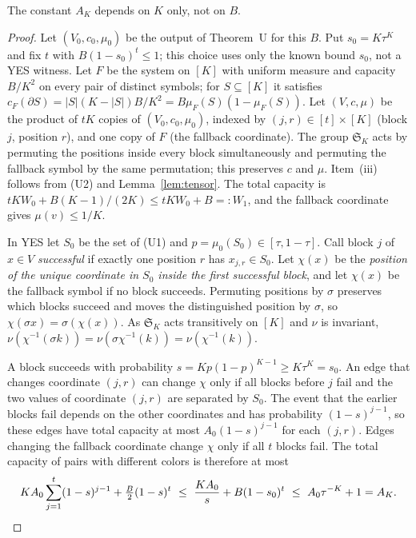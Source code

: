 \documentclass[11pt,letterpaper]{article}
\theoremstyle{definition}
\theoremstyle{remark}
\begin{document}
The constant \(A_K\) depends on \(K\) only, not on \(B\).

\begin{proof}
Let \((V_0,c_0,\mu_0)\) be the output of Theorem~U for this \(B\). Put
\(s_0=K\tau^K\) and fix \(t\) with \(B(1-s_0)^t\le1\); this choice uses only
the known bound \(s_0\), not a YES witness. Let \(F\) be the system on \([K]\)
with uniform measure and capacity \(B/K^2\) on every pair of distinct
symbols; for \(S\subseteq[K]\) it satisfies
\(c_F(\partial S)=|S|(K-|S|)B/K^2=B\mu_F(S)(1-\mu_F(S))\). Let \((V,c,\mu)\)
be the product of \(tK\) copies of \((V_0,c_0,\mu_0)\), indexed by
\((j,r)\in[t]\times[K]\) (block \(j\), position \(r\)), and one copy of
\(F\) (the fallback coordinate). The group \(\mathfrak S_K\) acts by
permuting the positions inside every block simultaneously and permuting the
fallback symbol by the same permutation; this preserves \(c\) and \(\mu\).
Item~(iii) follows from (U2) and Lemma~\ref{lem:tensor}. The total capacity
is \(tKW_0+B(K-1)/(2K)\le tKW_0+B=:W_1\), and the fallback coordinate gives
\(\mu(v)\le1/K\).

In YES let \(S_0\) be the set of (U1) and \(p=\mu_0(S_0)\in[\tau,1-\tau]\).
Call block \(j\) of \(x\in V\) \emph{successful} if exactly one position
\(r\) has \(x_{j,r}\in S_0\). Let \(\chi(x)\) be the \emph{position of the
unique coordinate in \(S_0\) inside the first successful block}, and let
\(\chi(x)\) be the fallback symbol if no block succeeds. Permuting positions
by \(\sigma\) preserves which blocks succeed and moves the distinguished
position by \(\sigma\), so \(\chi(\sigma x)=\sigma(\chi(x))\). As
\(\mathfrak S_K\) acts transitively on \([K]\) and \(\nu\) is invariant,
\(\nu(\chi^{-1}(\sigma k))=\nu(\sigma\chi^{-1}(k))=\nu(\chi^{-1}(k))\).

A block succeeds with probability \(s=Kp(1-p)^{K-1}\ge K\tau^K=s_0\). An
edge that changes coordinate \((j,r)\) can change \(\chi\) only if all
blocks before \(j\) fail and the two values of coordinate \((j,r)\) are
separated by \(S_0\). The event that the earlier blocks fail depends on the
other coordinates and has probability \((1-s)^{j-1}\), so these edges have
total capacity at most \(A_0(1-s)^{j-1}\) for each \((j,r)\). Edges changing
the fallback coordinate change \(\chi\) only if all \(t\) blocks fail. The
total capacity of pairs with different colors is therefore at most
\[
KA_0\sum_{j=1}^t(1-s)^{j-1}+\tfrac B2(1-s)^t\ \le\ \frac{KA_0}{s}+B(1-s_0)^t
\ \le\ A_0\tau^{-K}+1=A_K.\qedhere
\]
\end{proof}
\end{document}
